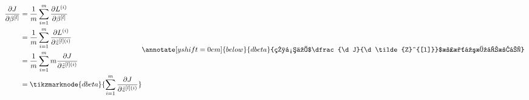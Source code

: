 \begin{equation}
    \begin{aligned}
        \dfrac{\partial J}{\partial \beta^{[l]}} 
        &= \dfrac{1}{m} \sum_{i=1}^m \dfrac{\partial L^{(i)}}{\partial \beta^{[l]}} \\
        &= \dfrac{1}{m} \sum_{i=1}^m \dfrac{\partial L^{(i)}}{\partial \tilde{z}^{[l](i)}} \\
        &= \dfrac{1}{m} \sum_{i=1}^m m \dfrac{\partial J}{\partial \tilde{z}^{[l](i)}} \\
        &= \tikzmarknode{dbeta}{\sum_{i=1}^m \dfrac{\partial J}{\partial \tilde{z}^{[l](i)}}}
    \end{aligned}
    \renewcommand{\eqnannotationstrut}{\rule[-0.7\baselineskip]{0pt}{1.5\baselineskip}} %
    \annotate[yshift=0em]{below}{dbeta}{相当于$\dfrac{\d J}{\d \tilde{Z}^{[l]}}$沿水平方向求和}
    \renewcommand{\eqnannotationstrut}{\strut} %
    \vspace{2em}
\end{equation}


